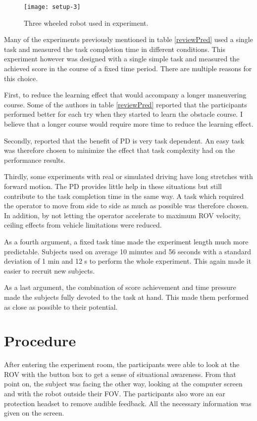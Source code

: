 \begin{figure}[h!]
    \centering
    \texttt{[image: setup-3]}
    \caption{Three wheeled robot used in experiment.}
    \label{setup3}
\end{figure}

Many of the experiments previously mentioned in table \ref{reviewPred} used a single task and measured the task completion time in different conditions. This experiment however was designed with a single simple task and measured the achieved score in the course of a fixed time period. There are multiple reasons for this choice. 

First, to reduce the learning effect that would accompany a longer maneuvering course. Some of the authors in table \ref{reviewPred} reported that the participants performed better for each try when they started to learn the obstacle course. I believe that a longer course would require more time to reduce the learning effect.

Secondly, \citep{Chen2007} reported that the benefit of PD is very task dependent. An easy task was therefore chosen to minimize the effect that task complexity had on the performance results. 

Thirdly, some experiments with real or simulated driving have long stretches with forward motion. The PD provides little help in these situations but still contribute to the task completion time in the same way. A task which required the operator to move from side to side as much as possible was therefore chosen. In addition, by not letting the operator accelerate to maximum ROV velocity, ceiling effects from vehicle limitations were reduced. 

As a fourth argument, a fixed task time made the experiment length much more predictable. Subjects used on average 10 minutes and 56 seconds with a standard deviation of 1 min and 12 s to perform the whole experiment. This again made it easier to recruit new subjects. 

As a last argument, the combination of score achievement and time pressure made the subjects fully devoted to the task at hand. This made them performed as close as possible to their potential.

\section{Procedure}

After entering the experiment room, the participants were able to look at the ROV with the button box to get a sense of situational awareness. From that point on, the subject was facing the other way, looking at the computer screen and with the robot outside their FOV. The participants also wore an ear protection headset to remove audible feedback. All the necessary information was given on the screen.

